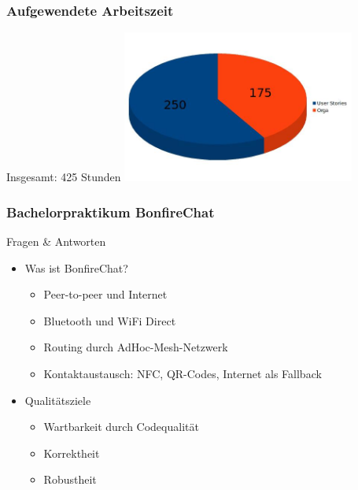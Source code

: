 \documentclass[accentcolor=tud2d,colorbacktitle]{tudbeamer}
\begin{document}
  \begin{frame}
    \frametitle{Aufgewendete Arbeitszeit}
    \begin{center}
      \huge{Insgesamt: 425 Stunden}
      \includegraphics[height=5cm]{zeiten2.jpg}
    \end{center}
  \end{frame}


  \begin{frame}
    \frametitle{Bachelorpraktikum BonfireChat}
    \begin{center}
      \huge{Fragen \& Antworten}
    \end{center}
    \vspace{0.5cm}
    \begin{multicols}{2}
      \begin{itemize}
        \item Was ist BonfireChat?
          \begin{itemize}
            \item Peer-to-peer und Internet
            \item Bluetooth und WiFi Direct
            \item Routing durch AdHoc-Mesh-Netzwerk
            \item Kontaktaustausch: NFC, QR-Codes, Internet als Fallback
          \end{itemize}
        \item Qualitätsziele
          \begin{itemize}
            \item Wartbarkeit durch Codequalität
            \item Korrektheit
            \item Robustheit
          \end{itemize}
          \vspace{1cm}
      \end{itemize}
    \end{multicols}
  \end{frame}
\end{document}
